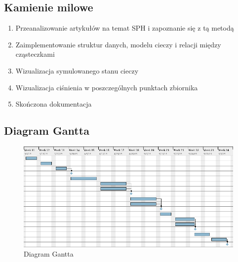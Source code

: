 \subsection{Kamienie milowe}
\begin{enumerate}[label=K\arabic*{.}]
    \item Przeanalizowanie artykułów na temat SPH i zapoznanie się z tą metodą
    \item Zaimplementowanie struktur danych, modelu cieczy i relacji między cząsteczkami
    \item Wizualizacja symulowanego stanu cieczy
    \item Wizualizacja ciśnienia w poszczególnych punktach zbiornika
    \item Skończona dokumentacja
\end{enumerate}

\newpage
\subsection{Diagram Gantta}
\begin{figure}[H] 
 \begin{center}
  \includegraphics[width=\textwidth]{../harmonogram/gantt_uaktualniony.png}
 \end{center}
 \caption{Diagram Gantta}
 \label{fig:gantt}
\end{figure}
 